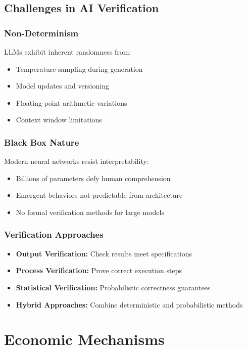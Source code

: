 \subsection{Challenges in AI Verification}

\subsubsection{Non-Determinism}
LLMs exhibit inherent randomness from:
\begin{itemize}
    \item Temperature sampling during generation
    \item Model updates and versioning
    \item Floating-point arithmetic variations
    \item Context window limitations
\end{itemize}

\subsubsection{Black Box Nature}
Modern neural networks resist interpretability:
\begin{itemize}
    \item Billions of parameters defy human comprehension
    \item Emergent behaviors not predictable from architecture
    \item No formal verification methods for large models
\end{itemize}

\subsubsection{Verification Approaches}
\begin{itemize}
    \item \textbf{Output Verification:} Check results meet specifications
    \item \textbf{Process Verification:} Prove correct execution steps
    \item \textbf{Statistical Verification:} Probabilistic correctness guarantees
    \item \textbf{Hybrid Approaches:} Combine deterministic and probabilistic methods
\end{itemize}

\section{Economic Mechanisms}

